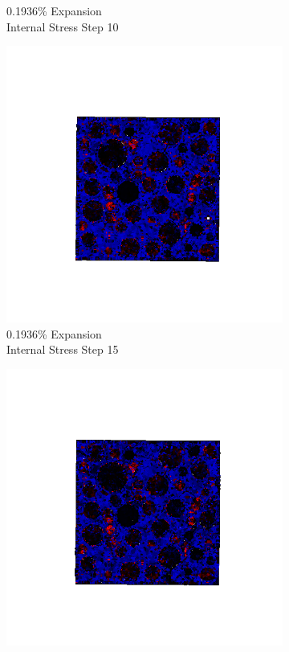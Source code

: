 \begin{figure}[ht!]
\begin{subfigure}{.25\textwidth}
      \caption{0.1936\% Expansion\\Internal Stress Step 10}
    \end{subfigure}%
    \begin{subfigure}{.25\textwidth}
      \centering
      \includegraphics[width=1.0\linewidth]{Files/exp_3D/ASR/A30P75_2_s15.png}
      \caption{0.1936\% Expansion\\Internal Stress Step 15}
    \end{subfigure}%
    \begin{subfigure}{.25\textwidth}
      \centering
      \includegraphics[width=1.0\linewidth]{Files/exp_3D/ASR/A30P75_2_stress.png}

\end{subfigure}
\end{figure}
